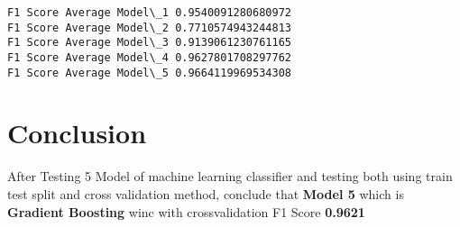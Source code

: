 \documentclass[11pt]{article}
\begin{document}
    \begin{Verbatim}[commandchars=\\\{\}]
F1 Score Average Model\_1 0.9540091280680972
F1 Score Average Model\_2 0.7710574943244813
F1 Score Average Model\_3 0.9139061230761165
F1 Score Average Model\_4 0.9627801708297762
F1 Score Average Model\_5 0.9664119969534308

    \end{Verbatim}

    \section{Conclusion}\label{conclusion}

    After Testing 5 Model of machine learning classifier and testing both
using train test split and cross validation method, conclude that
\textbf{Model 5} which is \textbf{Gradient Boosting} winc with
crossvalidation F1 Score \textbf{0.9621}


    
    
    
    
\end{document}
